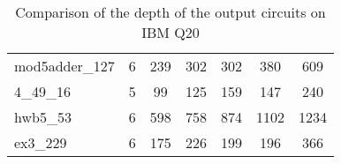 \documentclass[journal]{IEEEtran}
\begin{document}
\begin{table*}[htbp]
\begin{center}
\begin{tabular}{|p{4.3cm}<{\centering}|c|c|c|c|c|c|}
                        mod5adder\_127 & 6 & 239 & 302 & 302 & 380 & 609 \\ 
                        4\_49\_16 & 5 & 99 & 125 & 159 & 147 & 240 \\ 
                        hwb5\_53 & 6 & 598 & 758 & 874 & 1102 & 1234 \\ 
                        ex3\_229 & 6 & 175 & 226 & 199 & 196 & 366 \\ 
                    \hline
                        \end{tabular} 
                        \end{center} 	
                        \caption{Comparison of  the depth of the output circuits on  IBM Q20} 
                        \label{tab6}
                    \end{table*}
\end{document}
